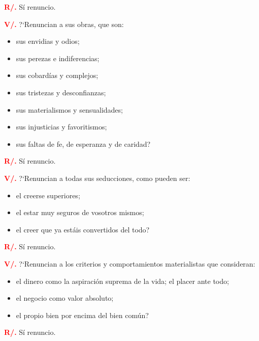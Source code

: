 \documentclass[12pt, letterpaper]{report}
\begin{document}
\noindent
\Large {\bfseries \textcolor{red}{R/.}} \hspace{0.5cm} S\'i renuncio. \newline

\newpage

\noindent
\Large {\bfseries \textcolor{red}{V/.}} \hspace{0.5cm} ?`Renuncian a sus obras, que son:
\begin{itemize}[leftmargin=2.0cm,labelsep=0.5cm]
\item sus envidias y odios;
\item sus perezas e indiferencias;
\item sus cobard\'ias y complejos;
\item sus tristezas y desconfianzas;
\item sus materialismos y sensualidades;
\item sus injusticias y favoritismos;
\item sus faltas de fe, de esperanza y de caridad?
\end{itemize}

\Large {\bfseries \textcolor{red}{R/.}} \hspace{0.5cm} S\'i renuncio. \newline

\noindent
\Large {\bfseries \textcolor{red}{V/.}} \hspace{0.5cm} ?`Renuncian a todas sus seducciones, como pueden ser:
\begin{itemize}[leftmargin=2.0cm,labelsep=0.5cm]
\item el creerse superiores;
\item el estar muy seguros de vosotros mismos;
\item el creer que ya est\'ais convertidos del todo?
\end{itemize}
\Large {\bfseries \textcolor{red}{R/.}} \hspace{0.5cm} S\'i renuncio. \newline

\newpage

\noindent
\Large {\bfseries \textcolor{red}{V/.}} \hspace{0.5cm} ?`Renuncian a los criterios y comportamientos materialistas que consideran:
\begin{itemize}[leftmargin=2.0cm,labelsep=0.5cm]
\item el dinero como la aspiraci\'on suprema de la vida; el placer ante todo;
\item el negocio como valor absoluto;
\item el propio bien por encima del bien com\'un?
\end{itemize}
\Large {\bfseries \textcolor{red}{R/.}} \hspace{0.5cm} S\'i renuncio. \newline
\end{document}
